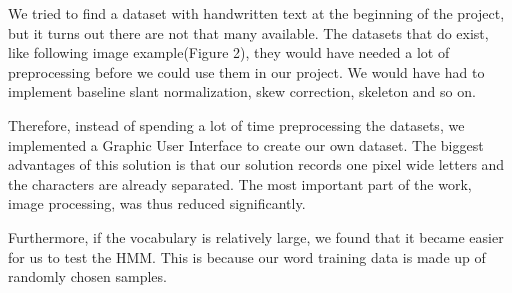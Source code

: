 
We tried to find a dataset with handwritten text at the beginning of the project, but it turns out there are not that many available. 
The datasets that do exist, like following image example(Figure 2), they would have needed a lot of preprocessing before we could use them in our project.
We would have had to implement baseline slant normalization, skew correction, skeleton and so on.

Therefore, instead of spending a lot of time preprocessing the datasets, we implemented a Graphic User Interface to create our own dataset.
The biggest advantages of this solution is that our solution records one pixel wide letters and the characters are already separated. 
The most important part of the work, image processing, was thus reduced significantly.

Furthermore, if the vocabulary is relatively large, we found that it became easier for us to test the HMM.
This is because our word training data is made up of randomly chosen samples.

